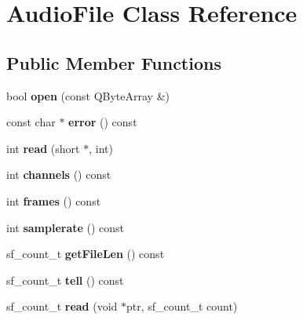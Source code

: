 \hypertarget{class_audio_file}{}\section{Audio\+File Class Reference}
\label{class_audio_file}
\subsection*{Public Member Functions}
\begin{DoxyCompactItemize}
\item 
\mbox{\label{class_audio_file_a1c644f9b1535d4475f97d44df530b040}} 
bool {\bfseries open} (const Q\+Byte\+Array \&)
\item 
\mbox{\label{class_audio_file_a214df689deb56b7409e2c6bca6edc61a}} 
const char $\ast$ {\bfseries error} () const
\item 
\mbox{\label{class_audio_file_a27141ca73321a337133f51ba60a6ab00}} 
int {\bfseries read} (short $\ast$, int)
\item 
\mbox{\label{class_audio_file_a73b406b2dbdf17df49a30db3d824acec}} 
int {\bfseries channels} () const
\item 
\mbox{\label{class_audio_file_a06c33cd5fd78b3e5914d9fbef245e4ec}} 
int {\bfseries frames} () const
\item 
\mbox{\label{class_audio_file_a883770abedde8a2b9fd0127e01e39887}} 
int {\bfseries samplerate} () const
\item 
\mbox{\label{class_audio_file_abce009f45f8f17287ec602bb40860620}} 
sf\+\_\+count\+\_\+t {\bfseries get\+File\+Len} () const
\item 
\mbox{\label{class_audio_file_adda60ace95edd3533dc7dad67506e59b}} 
sf\+\_\+count\+\_\+t {\bfseries tell} () const
\item 
\mbox{\label{class_audio_file_a9a758b2d575ab1886096a9a6c08b58da}} 
sf\+\_\+count\+\_\+t {\bfseries read} (void $\ast$ptr, sf\+\_\+count\+\_\+t count)
\item 

\end{DoxyCompactItemize}
